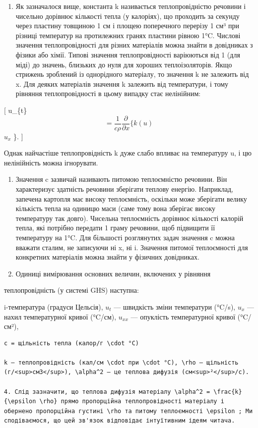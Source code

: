 \documentclass[
]{article}
\providecommand{\tightlist}{%
  \setlength{\itemsep}{0pt}\setlength{\parskip}{0pt}}
\begin{document}
\begin{enumerate}
\def\labelenumi{\arabic{enumi}.}
\tightlist
\item
  Як зазначалося вище, константа k називається теплопровідністю речовини
  і чисельно дорівнює кількості тепла (у калоріях), що проходить за
  секунду через пластину товщиною 1 см і площею поперечного перерізу 1
  см³ при різниці температур на протилежних гранях пластини рівною 1°C.
  Числові значення теплопровідності для різних матеріалів можна знайти в
  довідниках з фізики або хімії. Типові значення теплопровідності
  варіюються від 1 (для міді) до значень, близьких до нуля для хороших
  теплоізоляторів. Якщо стрижень зроблений із однорідного матеріалу, то
  значення k не залежить від x. Для деяких матеріалів значення k
  залежить від температури, і тому рівняння теплопровідності в цьому
  випадку стає нелінійним:
\end{enumerate}

{[}
u\_\{t\}\[= \frac{1}{c\rho} \frac{\partial}{\partial x} \{ k (u)\]\textbar{}
\(u_{x}\) \}. {]}

Однак найчастіше теплопровідність k дуже слабо впливає на температуру u,
і цю нелінійність можна ігнорувати.

\begin{enumerate}
\def\labelenumi{\arabic{enumi}.}
\setcounter{enumi}{1}
\item
  Значення c зазвичай називають питомою теплоємністю речовини. Він
  характеризує здатність речовини зберігати теплову енергію. Наприклад,
  запечена картопля має високу теплоємність, оскільки може зберігати
  велику кількість тепла на одиницю маси (саме тому вона зберігає високу
  температуру так довго). Чисельна теплоємність дорівнює кількості
  калорій тепла, які потрібно передати 1 граму речовини, щоб підвищити
  її температуру на 1°C. Для більшості розглянутих задач значення c
  можна вважати сталим, не записуючи ні x, ні i. Значення питомої
  теплоємності для конкретних матеріалів можна знайти у фізичних
  довідниках.
\item
  Одиниці вимірювання основних величин, включених у рівняння
\end{enumerate}

теплопровідність (у системі GHS) наступна:

i-температура (градуси Цельсія), \(u_t\) --- швидкість зміни температури
(°C/s), \(u_x\) --- нахил температурної кривої (°C/см), \(u_{xx}\) ---
опуклість температурної кривої (°C/см²),

\begin{verbatim}
c = щільність тепла (калор/г \cdot °C)

k — теплопровідність (кал/см \cdot при \cdot °C), \rho — щільність (г/<sup>см3</sup>), \alpha^2 — це теплова дифузія (см<sup>²</sup>/с).

4. Слід зазначити, що теплова дифузія матеріалу \alpha^2 = \frac{k}{\epsilon \rho} прямо пропорційна теплопровідності матеріалу і обернено пропорційна густині \rho та питому теплоємності \epsilon ; Ми сподіваємося, що цей зв'язок відповідає інтуїтивним ідеям читача.
\end{verbatim}
\end{document}
